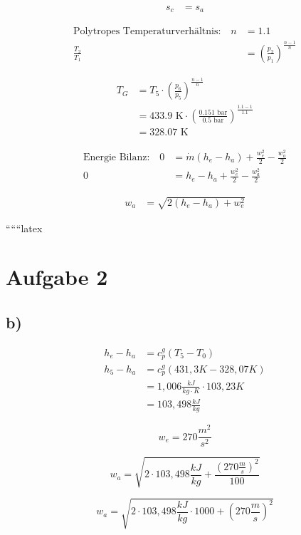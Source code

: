 \begin{align*}
    s_c &= s_a
\end{align*}

\begin{align*}
    \text{Polytropes Temperaturverhältnis:} \quad n &= 1.1 \\
    \frac{T_2}{T_1} &= \left(\frac{p_2}{p_1}\right)^{\frac{n-1}{n}}
\end{align*}

\begin{align*}
    T_G &= T_5 \cdot \left(\frac{p_6}{p_5}\right)^{\frac{n-1}{n}} \\
    &= 433.9 \text{ K} \cdot \left(\frac{0.151 \text{ bar}}{0.5 \text{ bar}}\right)^{\frac{1.1-1}{1.1}} \\
    &= 328.07 \text{ K}
\end{align*}

\begin{align*}
    \text{Energie Bilanz:} \quad 0 &= \dot{m} \left( h_e - h_a \right) + \frac{w_e^2}{2} - \frac{w_a^2}{2} \\
    0 &= h_e - h_a + \frac{w_e^2}{2} - \frac{w_a^2}{2}
\end{align*}

\begin{align*}
    w_a &= \sqrt{2 \left( h_e - h_a \right) + w_e^2}
\end{align*}

``````latex


\section*{Aufgabe 2}

\subsection*{b)}

\begin{align*}
h_e - h_a &= c_p^g (T_5 - T_0) \\
h_5 - h_a &= c_p^g (431,3K - 328,07K) \\
&= 1,006 \frac{kJ}{kg \cdot K} \cdot 103,23K \\
&= 103,498 \frac{kJ}{kg}
\end{align*}

\[
w_e = 270 \frac{m^2}{s^2}
\]

\[
w_a = \sqrt{2 \cdot 103,498 \frac{kJ}{kg} + \frac{(270 \frac{m}{s})^2}{100}}
\]

\[
w_a = \sqrt{2 \cdot 103,498 \frac{kJ}{kg} \cdot 1000 + (270 \frac{m}{s})^2}
\]

